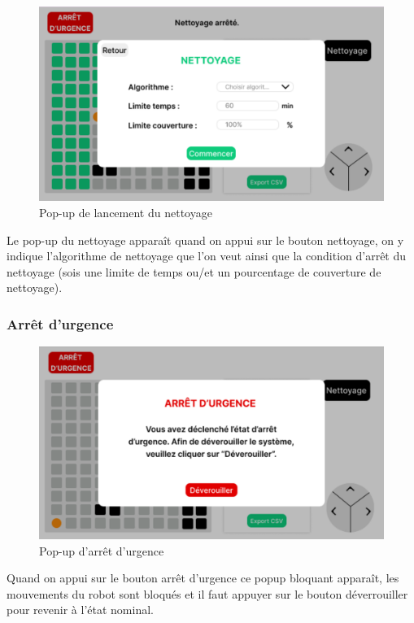 \begin{figure}[H]
    \centering
    \includegraphics[scale=0.25]{data/IHM2.png}
    \caption{Pop-up de lancement du nettoyage}
    \label{fig:ihm_android_popup}
\end{figure}

Le pop-up du nettoyage apparaît quand on appui sur le bouton nettoyage, on y indique l'algorithme de nettoyage que l'on veut ainsi que la condition d'arrêt du nettoyage (sois une limite de temps ou/et un pourcentage de couverture de nettoyage).

\subsubsection{Arrêt d'urgence}

\begin{figure}[H]
    \centering
    \includegraphics[scale=0.25]{data/IHM3.png}
    \caption{Pop-up d'arrêt d'urgence}
    \label{fig:ihm_android_emergency}
\end{figure}

Quand on appui sur le bouton arrêt d'urgence ce popup bloquant apparaît, les mouvements du robot sont bloqués et il faut appuyer sur le bouton déverrouiller pour revenir à l'état nominal. 

